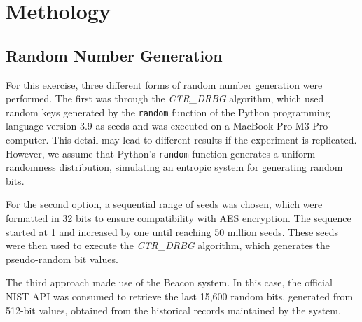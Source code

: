 \section{Methology}
\subsection{Random Number Generation}
\label{sec:random_generation}

For this exercise, three different forms of random number generation were performed. The first was through the \textit{CTR\_DRBG} algorithm, which used random keys generated by the \texttt{random} function of the Python programming language version 3.9 as seeds and was executed on a MacBook Pro M3 Pro computer. This detail may lead to different results if the experiment is replicated. However, we assume that Python's \texttt{random} function generates a uniform randomness distribution, simulating an entropic system for generating random bits.

For the second option, a sequential range of seeds was chosen, which were formatted in 32 bits to ensure compatibility with AES encryption. The sequence started at 1 and increased by one until reaching 50 million seeds. These seeds were then used to execute the \textit{CTR\_DRBG} algorithm, which generates the pseudo-random bit values.

The third approach made use of the Beacon system. In this case, the official NIST API was consumed to retrieve the last 15,600 random bits, generated from 512-bit values, obtained from the historical records maintained by the system.
